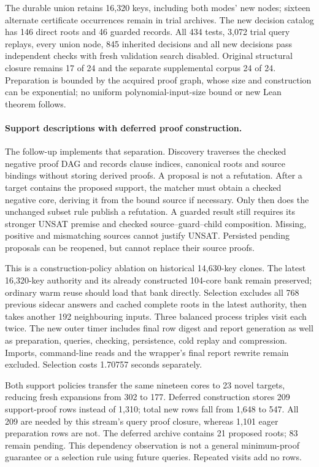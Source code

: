 \documentclass[11pt,a4paper]{article}
\numberwithin{equation}{section}
\theoremstyle{plain}
\theoremstyle{definition}
\theoremstyle{remark}
\begin{document}
The durable union retains 16,320 keys, including both modes' new nodes; sixteen
alternate certificate occurrences remain in trial archives. The new decision
catalog has 146 direct roots and 46 guarded records. All 434 tests, 3,072 trial
query replays, every union node, 845 inherited decisions and all new decisions
pass independent checks with fresh validation search disabled. Original
structural closure remains 17 of 24 and the separate supplemental corpus 24
of 24. Preparation is bounded by the acquired proof graph, whose size and
construction can be exponential; no uniform polynomial-input-size bound or new
Lean theorem follows.

\paragraph{Support descriptions with deferred proof construction.}
The follow-up implements that separation. Discovery traverses the checked
negative proof DAG and records clause indices, canonical roots and source
bindings without storing derived proofs. A proposal is not a refutation.
After a target contains the proposed support, the matcher must obtain a checked
negative core, deriving it from the bound source if necessary. Only then does
the unchanged subset rule publish a refutation. A guarded result still requires
its stronger UNSAT premise and checked source--guard--child composition.
Missing, positive and mismatching sources cannot justify UNSAT. Persisted
pending proposals can be reopened, but cannot replace their source proofs.

This is a construction-policy ablation on historical 14,630-key clones. The
latest 16,320-key authority and its already constructed 104-core bank remain
preserved; ordinary warm reuse should load that bank directly. Selection excludes
all 768 previous sidecar answers and cached complete roots in the latest
authority, then takes another 192 neighbouring inputs. Three balanced process
triples visit each twice. The new outer timer includes final row digest and
report generation as well as preparation, queries, checking, persistence,
cold replay and compression. Imports, command-line reads and the wrapper's
final report rewrite remain excluded. Selection costs 1.70757 seconds separately.

Both support policies transfer the same nineteen cores to 23 novel targets,
reducing fresh expansions from 302 to 177. Deferred construction stores 209
support-proof rows instead of 1,310; total new rows fall from 1,648 to 547.
All 209 are needed by this stream's query proof closure, whereas 1,101 eager
preparation rows are not. The deferred archive contains 21 proposed roots;
83 remain pending. This dependency observation is not a general minimum-proof
guarantee or a selection rule using future queries. Repeated visits add no rows.
\end{document}
